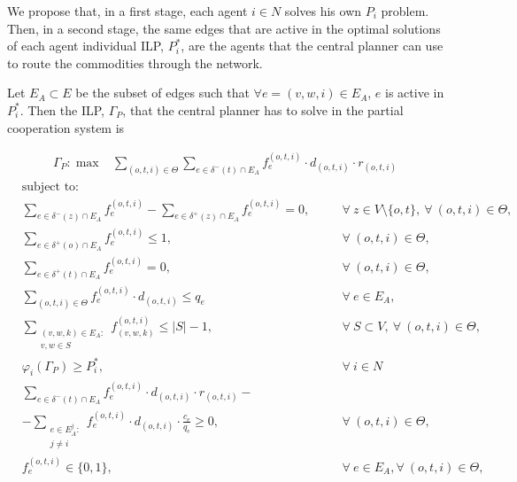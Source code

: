 \documentclass[review]{elsarticle}
\begin{document}
We propose that, in a first stage, each agent $i \in N$ solves his own $P_i$ problem. Then, in a second stage, the same edges that are active in the optimal solutions of each agent individual ILP, $P_i^*$, are the agents that the central planner can use to route the commodities through the network.

Let $E_A \subset E$ be the subset of edges such that $\forall e=(v,w,i) \in
E_A$, $e$ is active in $P_i^*$. Then the ILP, $\Gamma_P$, that the central planner has to solve in the partial cooperation system is

\begin{align}
        &  \Gamma_P: \max  & \sum_{(o,t,i) \in \Theta} \sum_{e \in \delta^-(t)\cap E_A}  f_e^{(o,t,i)} \cdot d_{(o,t,i)} \cdot r_{(o,t,i)}  &&   \label{eq:Partial2CooperationA} 
    \end{align}
    \begin{align}
        & \text{subject to:}       && \nonumber\\
        & \sum_{e \in \delta^-(z)\cap E_A} f_e^{(o,t,i)}-\sum_{e \in \delta^+(z)\cap E_A} f_{e}^{(o,t,i)} = 0,            \quad && \forall\ z\in V\setminus\{o,t\},\ \forall\ (o,t,i)\in\Theta,  \label{eq:Partial2CooperationB}\\[1em]
& \sum_{e \in \delta^+(o)\cap E_A} f_e^{(o,t,i)} \leq 1,  && \forall\ (o,t,i)\in \Theta, \label{eq:Partial2CooperationC} \\
& \sum_{e \in \delta^+(t)\cap E_A} f_e^{(o,t,i)} = 0,  && \forall\ (o,t,i)\in \Theta, \label{eq:Partial2CooperationD} \\
 & \sum_{(o,t,i) \in \Theta} f_e^{(o,t,i)}\cdot d_{(o,t,i)} \leq q_e     && \forall\ e \in E_A, \label{eq:Partial2CooperationE}  \\
 & \sum_{\substack{(v,w,k) \in E_A\colon \\ v,w \in S}} f_{(v,w,k)}^{(o,t,i)}  \leq |S| -1,    && \forall\ S \subset V,\ \forall\ (o,t,i) \in \Theta, \label{eq:Partial2CooperationF}\\
& \varphi_i(\Gamma_P)   \geq P_i^*,     && \forall\ i\in N \label{eq:Partial2CooperationG}\\
&\sum_{e \in \delta^-(t)\cap E_A}  f_e^{(o,t,i)} \cdot d_{(o,t,i)} \cdot r_{(o,t,i)} - && \nonumber\\
& -\sum_{\substack{e \in E_A^j\colon \\ j\not = i}} f_e^{(o,t,i)} \cdot d_{(o,t,i)} \cdot \frac{c_e}{q_e}\geq 0, && \forall\ (o,t,i) \in \Theta, \label{eq:Partial2CooperationH} \\
 & f_e^{(o,t,i)}  \in \{0,1\},    && \forall\ e \in E_A, \forall\ (o,t,i) \in \Theta, \label{eq:Partial2CooperationI} \\
    \end{align}
\end{document}
